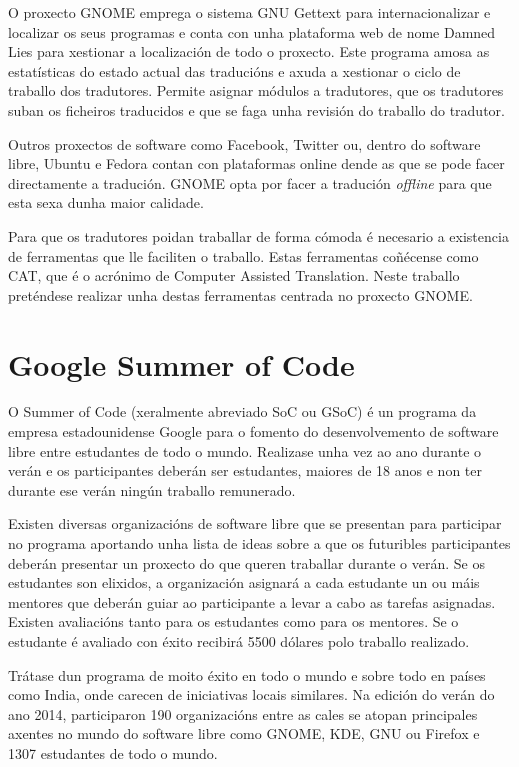 O proxecto GNOME emprega o sistema GNU Gettext para internacionalizar e localizar os seus programas e conta con unha plataforma web de nome Damned Lies para xestionar a localización de todo o proxecto. Este programa amosa as estatísticas do estado actual das traducións e axuda a xestionar o ciclo de traballo dos tradutores. Permite asignar módulos a tradutores, que os tradutores suban os ficheiros traducidos e que se faga unha revisión do traballo do tradutor.

Outros proxectos de software como Facebook, Twitter ou, dentro do software libre, Ubuntu e Fedora contan con plataformas online dende as que se pode facer directamente a tradución. GNOME opta por facer a tradución \emph{offline} para que esta sexa dunha maior calidade.

Para que os tradutores poidan traballar de forma cómoda é necesario a existencia de ferramentas que lle faciliten o traballo. Estas ferramentas coñécense como CAT, que é o acrónimo de Computer Assisted Translation. Neste traballo preténdese realizar unha destas ferramentas centrada no proxecto GNOME.

\section{Google Summer of Code}
O Summer of Code (xeralmente abreviado SoC ou GSoC) é un programa da empresa estadounidense Google para o fomento do desenvolvemento de software libre entre estudantes de todo o mundo. Realizase unha vez ao ano durante o verán e os participantes deberán ser estudantes, maiores de 18 anos e non ter durante ese verán ningún traballo remunerado.

Existen diversas organizacións de software libre que se presentan para participar no programa aportando unha lista de ideas sobre a que os futuribles participantes deberán presentar un proxecto do que queren traballar durante o verán. Se os estudantes son elixidos, a organización asignará a cada estudante un ou máis mentores que deberán guiar ao participante a levar a cabo as tarefas asignadas. Existen avaliacións tanto para os estudantes como para os mentores. Se o estudante é avaliado con éxito recibirá 5500 dólares polo traballo realizado.

Trátase dun programa de moito éxito en todo o mundo e sobre todo en países como India, onde carecen de iniciativas locais similares. Na edición do verán do ano 2014, participaron 190 organizacións entre as cales se atopan principales axentes no mundo do software libre como GNOME, KDE, GNU ou Firefox e 1307 estudantes de todo o mundo.


